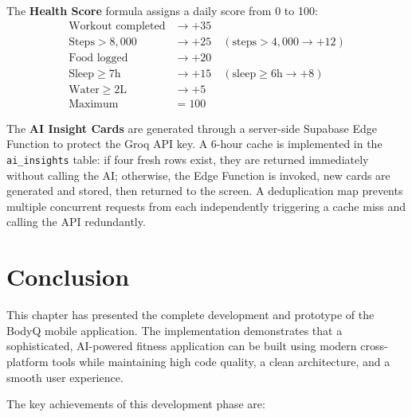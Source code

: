 The \textbf{Health Score} formula assigns a daily score from 0 to 100:
\begin{align*}
    \text{Workout completed} &\rightarrow +35 \\
    \text{Steps} > 8{,}000  &\rightarrow +25 \quad (\text{steps} > 4{,}000 \rightarrow +12) \\
    \text{Food logged}       &\rightarrow +20 \\
    \text{Sleep} \geq 7\text{h} &\rightarrow +15 \quad (\text{sleep} \geq 6\text{h} \rightarrow +8) \\
    \text{Water} \geq 2\text{L} &\rightarrow +5 \\
    \hline
    \text{Maximum}           &= 100
\end{align*}

The \textbf{AI Insight Cards} are generated through a server-side Supabase
Edge Function to protect the Groq API key. A 6-hour cache is implemented
in the \texttt{ai\_insights} table: if four fresh rows exist, they are
returned immediately without calling the AI; otherwise, the Edge Function
is invoked, new cards are generated and stored, then returned to the screen.
A deduplication map prevents multiple concurrent requests from each
independently triggering a cache miss and calling the API redundantly.

\section{Conclusion}

This chapter has presented the complete development and prototype of the
BodyQ mobile application. The implementation demonstrates that a
sophisticated, AI-powered fitness application can be built using modern
cross-platform tools while maintaining high code quality, a clean
architecture, and a smooth user experience.

The key achievements of this development phase are:

